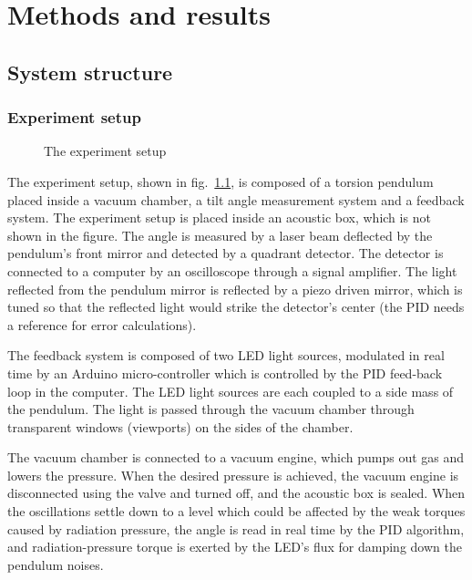 \documentclass[\main/master.tex]{subfiles}
\begin{document}
\newspacing
\chapter{Methods and results}\label{chapter:Methods and results}

\section{System structure}
\subsection{Experiment setup}
\begin{figure}[htbp]
	\centering
	\caption[The experiment setup]{The experiment setup}
	\label{fig:setup}
\end{figure}
\FloatBarrier
\par\noindent
The experiment setup, shown in fig.~\ref{fig:setup}, is composed of a torsion pendulum placed inside a vacuum chamber, a tilt angle measurement system and a feedback system. The experiment setup is placed inside an acoustic box, which is not shown in the figure. The angle is measured by a laser beam deflected by the pendulum's front mirror and detected by a quadrant detector. The detector is connected to a computer by an oscilloscope through a signal amplifier. The light reflected from the pendulum mirror is reflected by a piezo driven mirror, which is tuned so that the reflected light would strike the detector's center (the PID needs a reference for error calculations). 
\par\noindent
The feedback system is composed of two LED light sources, modulated in real time by an Arduino micro-controller which is controlled by the PID feed-back loop in the computer. The LED light sources are each coupled to a side mass of the pendulum. The light is passed through the vacuum chamber through transparent windows (viewports) on the sides of the chamber. 
\par\noindent
The vacuum chamber is connected to a vacuum engine, which pumps out gas and lowers the pressure. When the desired pressure is achieved, the vacuum engine is disconnected using the valve and turned off, and the acoustic box is sealed. When the oscillations settle down to a level which could be affected by the weak torques caused by radiation pressure, the angle is read in real time by the PID algorithm, and radiation-pressure torque is exerted by the LED's flux for damping down the pendulum noises.
\end{document}
